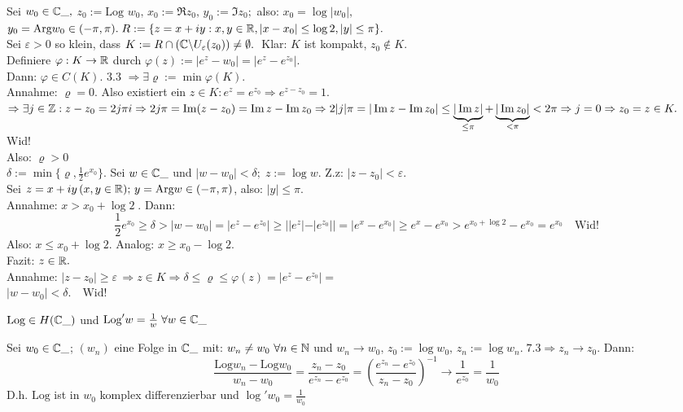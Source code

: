 \documentclass[a4paper,twoside,DIV15,BCOR12mm]{scrbook}
\def\Arg{\text{Arg}}
\def\Log{\text{Log}}
\begin{document}
\begin{beweis}
Sei $w_0 \in \mathbb{C}\_ ,$
$z_0 := \Log $ $w_0, \, x_0 := \Re z_0, \, y_0:=\Im z_0;$ also: $x_0 = \log |w_0|,$
$y_0 = \Arg w_0 \in (-\pi,\pi). \; R:= \{ z= x+iy: x,y \in \MdR, |x-x_0| \leq \log 2, |y| \leq  \pi \}.$\\
Sei $\varepsilon > 0$ so klein, dass $K:= R \cap \left( \mathbb{C} \backslash U_{\varepsilon}(z_0)\right) \not= \emptyset.\; $ Klar: $K$ ist kompakt, $z_0 \notin K.$\\
Definiere $\varphi: K \rightarrow \mathbb{R}$ durch $\varphi(z):= |e^z - w_0| = |e^z - e^{z_0}|$.\\
Dann: $\varphi \in C(K)$. 3.3 $\Rightarrow \exists \varrho := \min \varphi(K).$ \\
Annahme: $\varrho = 0$. Also existiert ein $z \in K: e^z = e^{z_0} \Rightarrow e^{z-z_0}=1.$  $\Rightarrow \exists j \in \mathbb{Z}: z-z_0 = 2j\pi i \Rightarrow 2j\pi = \mathop{\rm Im}\nolimits(z-z_0) = \mathop{\rm Im}\nolimits z - \mathop{\rm Im}\nolimits z_0 \Rightarrow 2|j|\pi = |\mathop{\rm Im}\nolimits z - \mathop{\rm Im}\nolimits z_0| \leq \underbrace{|\mathop{\rm Im}\nolimits z|}_{\leq \pi} + \underbrace{|\mathop{\rm Im}\nolimits z_0|}_{< \pi} < 2\pi \Rightarrow j = 0 \Rightarrow z_0 = z \in K.$ Wid!\\
Also: $\varrho > 0$\\
$\delta := \min\{ \varrho, \frac1{2}e^{x_0}\}.$ Sei $w \in \mathbb{C}\_$ und $|w-w_0| < \delta; \; z:=\log w.$ \; Z.z: $|z-z_0|<\varepsilon.$ \\
Sei $z=x+iy \, (x,y \in \MdR); \, y = \Arg w \in (-\pi,\pi)$, also: $|y| \leq \pi$. \\
Annahme: $x>x_0 + \log 2 \;$. Dann:\\
\[
\frac{1}{2} e^{x_0} \geq \delta > |w-w_0| = |e^z - e^{z_0}| \geq | |e^z| - |e^{z_0}| | = |e^x - e^{x_0}| \geq e^x - e^{x_0} > e^{x_0 + \log 2} - e^{x_0} = e^{x_0} \quad \mbox{Wid!}
\]
Also: $x \leq x_0 + \log 2.$ Analog: $x \geq x_0 - \log 2.$ \\
Fazit: $z\in \mathbb{R}.$\\
Annahme: $|z-z_0| \geq \varepsilon \, \Rightarrow z\in K \Rightarrow \delta \leq \varrho \leq \varphi(z) = |e^z - e^{z_0}| = $\\
$|w-w_0| < \delta. \quad \mbox{Wid!}$
\end{beweis}

\begin{satz}
$\Log \in H(\MdC\_)$ und $\Log'w= \frac1w \; \forall w \in \MdC\_$
\end{satz}

\begin{beweis}
Sei $w_0 \in \mathbb{C}\_$; $(w_n)$ eine Folge in $\mathbb{C}\_$ mit: $w_n \not= w_0 \ \forall n \in \mathbb{N}$ und $w_n \rightarrow w_0, \, z_0 := \log w_0, \, z_n:=\log w_n. \; 7.3 \Rightarrow z_n \rightarrow z_0.$ Dann:\\
\[
\frac{\Log w_n - \Log w_0}{w_n - w_0} = \frac{z_n-z_0}{e^{z_n}-e^{z_0}} = \left(\frac{e^{z_n}-e^{z_0}}{z_n -z_0}\right)^{-1} \rightarrow \frac1{e^{z_0}} = \frac1{w_0}
\]
D.h. $\Log$ ist in $w_0$ komplex differenzierbar und $\log'w_0 = \frac1{w_0}$
\end{beweis}
\end{document}
